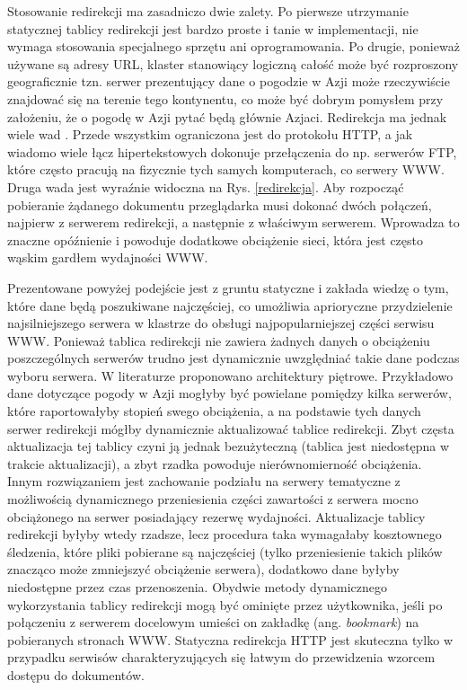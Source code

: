 Stosowanie redirekcji ma zasadniczo dwie zalety. Po pierwsze utrzymanie statycznej tablicy redirekcji jest 
bardzo proste i tanie w implementacji, nie wymaga stosowania specjalnego sprzętu ani oprogramowania. Po drugie, 
ponieważ używane są adresy URL, klaster stanowiący logiczną całość może być rozproszony geograficznie tzn. 
serwer prezentujący dane o pogodzie w Azji może rzeczywiście znajdować się na terenie tego kontynentu, co może 
być dobrym pomysłem przy założeniu, że o pogodę w Azji pytać będą głównie Azjaci.
Redirekcja ma jednak wiele wad \cite{barylo30}. Przede wszystkim ograniczona jest do protokołu HTTP, a jak wiadomo 
wiele łącz hipertekstowych dokonuje przełączenia do np. serwerów FTP, które często pracują na fizycznie tych 
samych komputerach, co serwery WWW. Druga wada jest wyraźnie widoczna na Rys. \ref{redirekcja}. Aby rozpocząć pobieranie 
żądanego dokumentu przeglądarka musi dokonać dwóch połączeń, najpierw z serwerem redirekcji, a następnie z 
właściwym serwerem. Wprowadza to znaczne opóźnienie i powoduje dodatkowe obciążenie sieci, która jest często 
wąskim gardłem wydajności WWW. 

Prezentowane powyżej podejście jest z gruntu statyczne i zakłada wiedzę o tym, które dane będą 
poszukiwane najczęściej, co umożliwia aprioryczne przydzielenie najsilniejszego serwera w klastrze do obsługi 
najpopularniejszej części serwisu WWW. Ponieważ tablica redirekcji nie zawiera żadnych danych o obciążeniu 
poszczególnych serwerów trudno jest  dynamicznie uwzględniać takie dane podczas wyboru serwera. W literaturze 
proponowano architektury piętrowe. Przykładowo dane dotyczące pogody w Azji mogłyby być powielane pomiędzy 
kilka serwerów, które raportowałyby stopień swego obciążenia, a na podstawie tych danych serwer redirekcji 
mógłby dynamicznie aktualizować tablice redirekcji. Zbyt częsta aktualizacja tej tablicy czyni ją jednak 
bezużyteczną (tablica jest niedostępna w trakcie aktualizacji), a zbyt rzadka powoduje nierównomierność 
obciążenia. Innym rozwiązaniem jest zachowanie podziału na serwery tematyczne z możliwością dynamicznego 
przeniesienia części zawartości z serwera mocno obciążonego na serwer posiadający rezerwę wydajności. 
Aktualizacje tablicy redirekcji byłyby wtedy rzadsze, lecz procedura taka wymagałaby kosztownego śledzenia, 
które pliki pobierane są najczęściej (tylko przeniesienie takich plików znacząco może zmniejszyć obciążenie 
serwera), dodatkowo dane byłyby niedostępne przez czas przenoszenia. Obydwie metody dynamicznego wykorzystania 
tablicy redirekcji mogą być ominięte przez użytkownika, jeśli po połączeniu z serwerem docelowym umieści on 
zakładkę (ang. \emph{bookmark}) na pobieranych stronach WWW. 
Statyczna redirekcja HTTP jest skuteczna tylko w przypadku serwisów charakteryzujących się łatwym do 
przewidzenia wzorcem dostępu do dokumentów.

